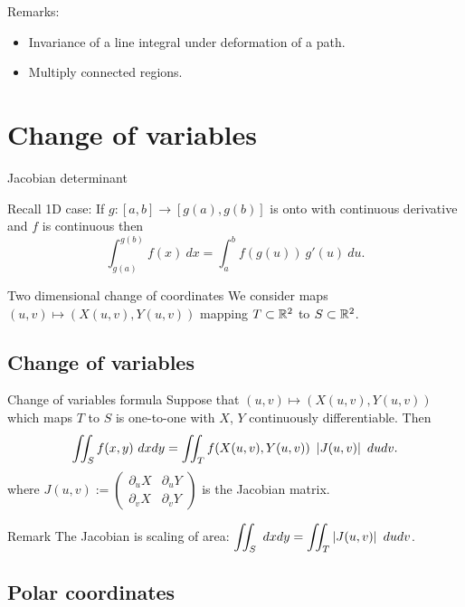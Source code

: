 {Remarks:}
\begin{itemize}
    \item     Invariance of a line integral under deformation of a path.
    \item Multiply connected regions.
\end{itemize}




\section{Change of variables}

{Jacobian determinant}

{Recall 1D case:}
If \(g : [a,b] \to [g(a),g(b)]\) is onto with continuous derivative and \(f\) is continuous then
\[
    \int_{g(a)}^{g(b)}    f(x) \ dx = \int_{a}^{b} f(g(u)) \ g'(u) \ du.
\]

{Two dimensional change of coordinates}
We consider maps \((u,v) \mapsto (X(u,v),Y(u,v))\) mapping  \(T\subset \mathbb{R}^2\) to  \(S\subset \mathbb{R}^2\).


\subsection{Change of variables}

{Change of variables formula}
Suppose that \((u,v) \mapsto (X(u,v),Y(u,v))\) which maps \(T\) to \(S\) is one-to-one with \(X\), \(Y\) continuously differentiable. Then
\[
    \iint_{S} f(x,y) \ dxdy = \iint_{T} f(X(u,v),Y(u,v)) \ \abs{J(u,v)} \ dudv.
\]
where
\(J(u,v):= \begin{pmatrix}
    \partial_u X & \partial_u Y \\ \partial_v X & \partial_v Y
\end{pmatrix}\) is the Jacobian matrix.


    {Remark}
The Jacobian is scaling of area: \(\displaystyle\iint_{S} \ dx dy = \displaystyle\iint_{T}  \left|J(u,v)\right| \ dudv \).




\subsection{Polar coordinates}


